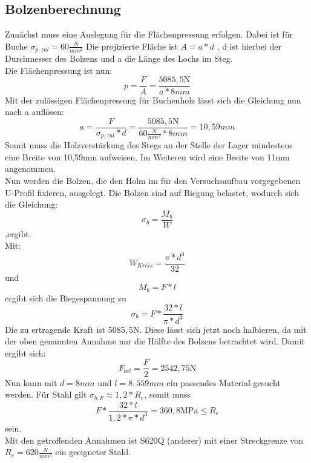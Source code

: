 

\subsection{Bolzenberechnung}
Zunächst muss eine Auslegung für die Flächenpressung erfolgen. Dabei ist für Buche $\sigma_{p,zul}=60\frac{N}{mm^2}$
Die projizierte Fläche ist $A=a*d$ , d ist hierbei der Durchmesser des Bolzens und a die Länge des Lochs im Steg.\\
Die Flächenpressung ist nun: 
\begin{equation}
	p=\frac{F}{A}=\frac{5085,5\mathrm{N}}{a*8mm}
\end{equation}
Mit der zulässigen Flächenpressung für Buchenholz lässt sich die Gleichung nun nach a auflösen:
\begin{equation}
	a=\frac{F}{\sigma_{p,zul}*d}=\frac{5085,5\mathrm{N}}{60\frac{N}{mm^{2}}*8mm}=10,59mm
\end{equation}
Somit muss die Holzverstärkung des Stegs an der Stelle der Lager mindestens eine Breite von 10,59$\mathrm{mm}$ aufweisen. Im Weiteren wird eine Breite von 11$\mathrm{mm}$ angenommen.\\
 
Nun werden die Bolzen, die den Holm im für den Versuchsaufbau vorgegebenen U-Profil fixieren, ausgelegt. Die Bolzen sind auf Biegung belastet, wodurch sich die Gleichung:
\begin{equation}
	\sigma_{b}=\frac{M_{b}}{W} 
\end{equation}
,ergibt.\\
 Mit: 
 \begin{equation}
 	W_{Kreis}=\frac{\pi*d^{3}}{32}
 \end{equation}
 und 
 \begin{equation}
 	M_{b}=F*l
 \end{equation}
 ergibt sich die Biegespannung zu
 \begin{equation}
 	\sigma_{b}=F*\frac{32*l}{\pi*d^{3}}
 \end{equation}
Die zu ertragende Kraft ist $5085,5 \mathrm{N}$. Diese lässt sich jetzt noch halbieren, da mit der oben genannten Annahme nur die Hälfte des Bolzens betrachtet wird. Damit ergibt sich:
 \begin{equation}
 	F_{bel}=\frac{F}{2} =2542,75 \mathrm{N}
 \end{equation}
 Nun kann mit $d=8mm$ und $l=8,559mm$ ein passendes Material gesucht werden. Für Stahl gilt $\sigma_{b,F}\approx1,2*R_{e}$, somit muss 
 \begin{equation}
 	F*\frac{32*l}{1,2*\pi*d^{3}}=360,8\mathrm{MPa}\leq
R_{e} \end{equation}  sein.\\

 Mit den getroffenden Annahmen ist S620Q (anderer) mit einer Streckgrenze von $R_{e}=620\frac{N}{mm^{2}}$ ein geeigneter Stahl.\cite{item6}\\
 
 
 
 
  
 
